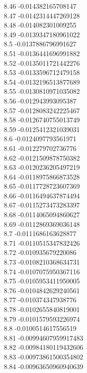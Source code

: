 {8.46	-0.014382165708147\\
8.47	-0.0142314447269128\\
8.48	-0.014082301009255\\
8.49	-0.0139347180961022\\
8.5	-0.0137886796991627\\
8.51	-0.0136441696991882\\
8.52	-0.0135011721442276\\
8.53	-0.0133596712479158\\
8.54	-0.0132196513877689\\
8.55	-0.0130810971035082\\
8.56	-0.012943993095387\\
8.57	-0.0128083242225467\\
8.58	-0.0126740755013749\\
8.59	-0.0125412321039031\\
8.6	-0.0124097793561971\\
8.61	-0.012279702736776\\
8.62	-0.0121509878750382\\
8.63	-0.0120236205497219\\
8.64	-0.0118975866873528\\
8.65	-0.0117728723607369\\
8.66	-0.0116494637874494\\
8.67	-0.0115273473283397\\
8.68	-0.0114065094860627\\
8.69	-0.0112869369036148\\
8.7	-0.0111686163628877\\
8.71	-0.0110515347832426\\
8.72	-0.010935679220086\\
8.73	-0.0108210368634731\\
8.74	-0.0107075950367116\\
8.75	-0.0105953411950005\\
8.76	-0.0104842629240561\\
8.77	-0.010374347938776\\
8.78	-0.0102655840819001\\
8.79	-0.0101579593226974\\
8.8	-0.0100514617556519\\
8.81	-0.00994607959917483\\
8.82	-0.00984180119432606\\
8.83	-0.00973861500354802\\
8.84	-0.00963650960940639\\
}
